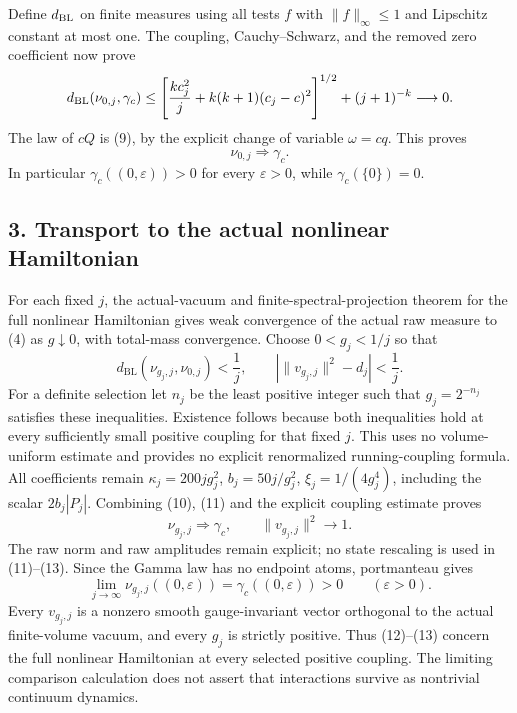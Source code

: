 \documentclass[
  11pt,
]{article}
\begin{document}
Define \(d_{\rm BL}\) on finite measures using all tests \(f\) with
\(\|f\|_\infty\le1\) and Lipschitz constant at most one. The coupling,
Cauchy--Schwarz, and the removed zero coefficient now prove \[
 d_{\rm BL}(\nu_{0,j},\gamma_c)
 \le
 \left[\frac{kc_j^2}{j}+k(k+1)(c_j-c)^2\right]^{1/2}
 +(j+1)^{-k}\longrightarrow0 .
\] The law of \(cQ\) is (9), by the explicit change of variable
\(\omega=cq\). This proves \[
 \nu_{0,j}\Longrightarrow\gamma_c.                    \tag{10}
\] In particular \(\gamma_c((0,\varepsilon))>0\) for every
\(\varepsilon>0\), while \(\gamma_c(\{0\})=0\).

\subsection{3. Transport to the actual nonlinear
Hamiltonian}\label{weak-coupling-part-4-transport-to-the-actual-nonlinear-hamiltonian}

For each fixed \(j\), the actual-vacuum and finite-spectral-projection
theorem for the full nonlinear Hamiltonian gives weak convergence of the
actual raw measure to (4) as \(g\downarrow0\), with total-mass
convergence. Choose \(0<g_j<1/j\) so that \[
 d_{\mathrm{BL}}(\nu_{g_j,j},\nu_{0,j})<\frac1j,\qquad
 \left|\|v_{g_j,j}\|^2-d_j\right|<\frac1j.               \tag{11}
\] For a definite selection let \(n_j\) be the least positive integer
such that \(g_j=2^{-n_j}\) satisfies these inequalities. Existence
follows because both inequalities hold at every sufficiently small
positive coupling for that fixed \(j\). This uses no volume-uniform
estimate and provides no explicit renormalized running-coupling formula.
All coefficients remain \(\kappa_j=200jg_j^2\), \(b_j=50j/g_j^2\),
\(\xi_j=1/(4g_j^4)\), including the scalar \(2b_j|P_j|\). Combining
(10), (11) and the explicit coupling estimate proves \[
 \nu_{g_j,j}\Longrightarrow\gamma_c,\qquad
 \|v_{g_j,j}\|^2\longrightarrow1.                       \tag{12}
\] The raw norm and raw amplitudes remain explicit; no state rescaling
is used in (11)--(13). Since the Gamma law has no endpoint atoms,
portmanteau gives \[
 \lim_{j\to\infty}
 \nu_{g_j,j}((0,\varepsilon))
 =\gamma_c((0,\varepsilon))>0
 \qquad(\varepsilon>0).                                \tag{13}
\] Every \(v_{g_j,j}\) is a nonzero smooth gauge-invariant vector
orthogonal to the actual finite-volume vacuum, and every \(g_j\) is
strictly positive. Thus (12)--(13) concern the full nonlinear
Hamiltonian at every selected positive coupling. The limiting comparison
calculation does not assert that interactions survive as nontrivial
continuum dynamics.
\end{document}
